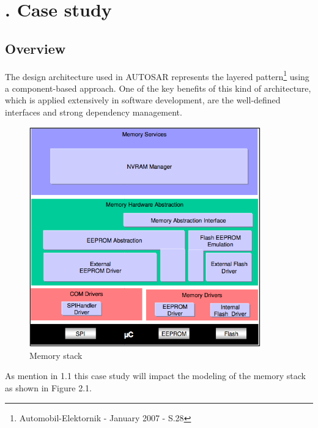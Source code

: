 \newpage
\chapter[Case study]{\thechapter. Case study}
\section{Overview}
The design architecture used in AUTOSAR represents the layered pattern\footnote{Automobil-Elektornik - January 2007 - S.28} using a component-based approach. One of the key benefits of this kind of architecture, which is applied extensively in software development, are the well-defined interfaces and strong dependency management.\newline
\begin{figure}[Memory stack - Components]
\centering
\includegraphics[width=10cm]{Images/Figure2_1.png}
\caption{Memory stack}
\end{figure}
As mention in 1.1 this case study will impact the modeling of the memory stack as shown in Figure 2.1.
\newpage

\newpage

\newpage

\newpage

